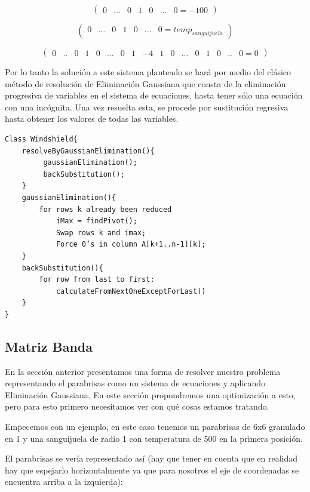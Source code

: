 \[ \left( \begin{array}{ccccccccccc}
0 & ... & 0 & 1 & 0  & ... & 0 = -100 \end{array} 
\right)\] 


\[ \left( \begin{array}{ccccccccccc}
 0 &... & 0 & 1 & 0  & ... & 0 = temp_{sanguijuela} \end{array} 
\right)\] 



\[ \left( \begin{array}{cccccccccccccccccc}
0 & .. & 0 & 1 & 0 & ... & 0 & 1 & -4 & 1 & 0  & ... & 0 & 1 & 0 & .. & 0 = 0 \end{array} 
\right)\] 

 

Por lo tanto la solución a este sistema planteado se hará por medio del clásico método de resolución de Eliminación Gaussiana que consta de la eliminación progresiva de variables en el sistema de ecuaciones, hasta tener sólo una ecuación con una incógnita. Una vez resuelta esta, se procede por sustitución regresiva hasta obtener los valores de todas las variables.

\begin{verbatim}
Class Windshield{
    resolveByGaussianElimination(){
         gaussianElimination();
         backSubstitution();
    } 
    gaussianElimination(){
        for rows k already been reduced
            iMax = findPivot();
            Swap rows k and imax;
            Force 0’s in column A[k+1..n-1][k];
    }
    backSubstitution(){
        for row from last to first:
            calculateFromNextOneExceptForLast()
    }
}
\end{verbatim}

\subsection{Matriz Banda}

En la sección anterior presentamos una forma de resolver nuestro problema representando el parabrisas como un sistema de ecuaciones y aplicando Eliminación Gaussiana. En este sección propondremos una optimización a esto, pero para esto primero necesitamos ver con qué cosas estamos tratando.

Empecemos con un ejemplo, en este caso  tenemos un parabrisas de 6x6 granulado en 1 y una sanguijuela de radio 1 con temperatura de 500 en la primera posición.

El parabrisas se vería representado así (hay que tener en cuenta que en realidad hay que espejarlo horizontalmente ya que para nosotros el eje de coordenadas se encuentra arriba a la izquierda):

